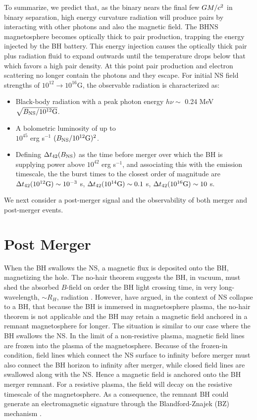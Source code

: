 To summarize, we predict that, as the binary nears the final few
$GM/c^2$ in binary separation, high energy curvature radiation will
produce pairs by interacting with other photons and also the magnetic
field. The BHNS magnetosphere becomes optically thick to pair
production, trapping the energy injected by the BH battery. This
energy injection causes the optically thick pair plus radiation fluid
to expand outwards until the temperature drops below that which favors
a high pair density. At this point pair production and electron
scattering no longer contain the photons and they escape. For initial
NS field strengths of $10^{12} \rightarrow 10^{16}$G, the observable
radiation is characterized as:
\begin{itemize}
\item Black-body radiation with a peak photon energy $h \nu \sim$ 0.24
  MeV $\sqrt{B_{\rm NS}/10^{12}\rm{G}}$.
%
\item A bolometric luminosity of up to \\ $10^{45}$ erg s$^{-1}$
  $(B_{\rm NS}/10^{12}\rm{G})^2$.
%
\item Defining $\Delta t_{42}(B_{\rm NS})$ as the time before merger
  over which the BH is supplying power above $10^{42}$ erg s$^{-1}$,
  and associating this with the emission timescale, the the burst
  times to the closest order of magnitude are $\Delta t_{42}(10^{12}
  \rm{G}) \sim 10^{-3}$ s, $\Delta t_{42}(10^{14} \rm{G}) \sim 0.1$ s,
  $\Delta t_{42}(10^{16} \rm{G}) \sim 10$ s.
\end{itemize}
We next consider a post-merger signal and the observability of both
merger and post-merger events.



\section{Post Merger}
\label{Post-Merger}
When the BH swallows the NS, a magnetic flux is deposited onto the BH,
magnetizing the hole. The no-hair theorem suggests the BH, in vacuum,
must shed the absorbed $B$-field on order the BH light crossing time,
in very long-wavelength, $\sim R_{H}$, radiation \citep[{\em
    e.g.},][]{BaumShap:2003}. However, \cite{LyutikovMckinney:2011} have argued, in the context of NS collapse to a BH, that because the BH is immersed in magnetosphere plasma, the no-hair theorem is not applicable and the BH may retain a magnetic field anchored in a remnant magnetosphere for longer. The situation is similar to our case where the BH swallows the NS. In the limit of a non-resistive plasma, magnetic field lines are frozen into the plasma of the magnetosphere. Because of the frozen-in condition, field lines which connect the NS surface to infinity before merger must also connect the BH horizon to infinity after merger, while closed field lines are swallowed along with the NS.  Hence a magnetic field is anchored onto the BH merger remnant. For a resistive plasma, the field will decay on the resistive timescale of the magnetosphere. As a consequence, the remnant BH could
generate an electromagnetic signature through the Blandford-Znajek
(BZ) mechanism \citep{BZ:1977, LyutikovMckinney:2011}.

